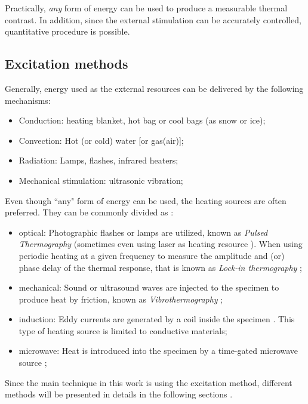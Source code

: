 Practically, \textit{any} form of energy can be used to produce a measurable thermal contrast. In addition, since the external stimulation can be accurately controlled, quantitative procedure is possible. 

\subsection*{Excitation methods}
Generally, energy used as the external resources can be delivered by the following mechanisms:
\begin{itemize}
	\item Conduction: heating blanket, hot bag or cool bags (as snow or ice);
	\item Convection: Hot (or cold) water [or gas(air)];
	\item Radiation: Lamps, flashes, infrared heaters;
	\item Mechanical stimulation: ultrasonic vibration;
\end{itemize}
Even though ``any" form of energy can be used, the heating sources are often preferred. They can be commonly divided as \citep{ibarra2013infrared}:
\begin{itemize}
	\item optical: Photographic flashes or lamps are utilized, known as \textit{Pulsed Thermography} (sometimes even using laser as heating resource \citep{suzuki2002application,burrows2007combined}). When using periodic heating at a given frequency to measure the amplitude and (or) phase delay  of the thermal response, that is known as \textit{Lock-in thermography} \citep{wu1998lock,duan2013quantitative,2007-Ibarra-Castanedo};
	\item mechanical: Sound or ultrasound waves are injected to the specimen to produce heat by friction, known as \textit{Vibrothermography} \citep{2007-ClementeIbarra-Castanedo,2007-Ibarra-Castanedo};
	\item induction: Eddy currents are generated by a coil inside the specimen \citep{riegert2004lockin,zenzinger2007thermographic}. This type of heating source is limited to conductive materials;
	\item microwave: Heat is introduced into the specimen by a time-gated microwave source \citep{myers1979microwave,land1987clinical};
\end{itemize}
Since the main technique in this work is using the excitation method, different methods will be presented in details in the following sections \citep{Maldague2001theory,ibarra2013infrared}.
